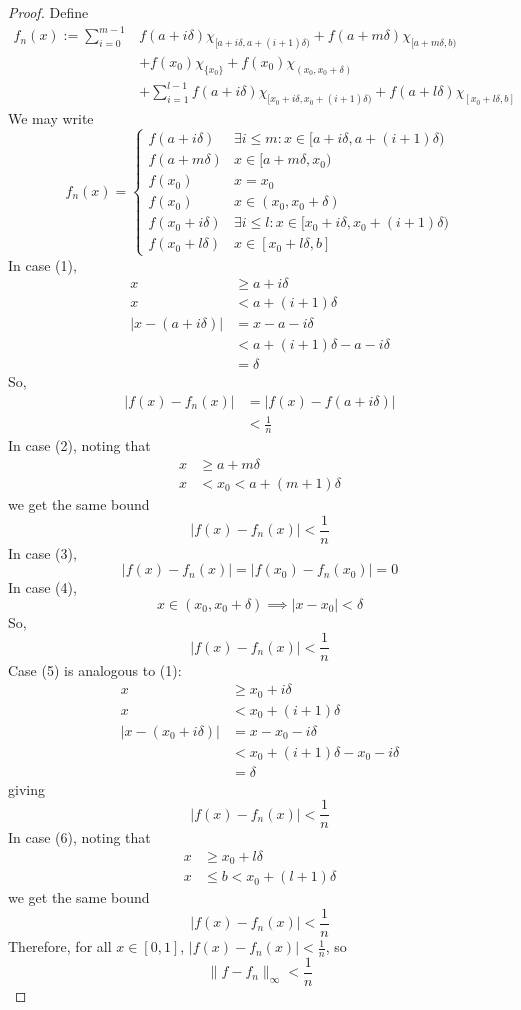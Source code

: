 \documentclass[12pt, reqno]{amsart}
\theoremstyle{definition}
\theoremstyle{remark}
\begin{document}
\begin{itemize}
\begin{itemize}
\begin{proof}
Define \begin{align*}f_{n}(x):= \sum_{i=0}^{m-1} &f(a+ i \delta)\chi_{[a+i \delta,a+(i+1) \delta)}+f\left(a+m \delta\right)\chi_{[a+m \delta,b)}\\
&+f(x_{0})\chi_{\{x_{0}\}}+f(x_{0})\chi_{(x_{0},x_{0}+\delta)}\\
&+\sum_{i=1}^{l-1}f(a+ i \delta) \chi_{[x_{0}+i \delta,x_{0}+(i+1)\delta)}+f(a+l \delta)\chi_{[x_{0}+l \delta,b]}
\end{align*}We may write 
\[
f_{n}(x)= \begin{cases}
f(a+i \delta) & \exists i\le m: x\in[a+i \delta,a+(i+1)\delta)\\
f(a+m \delta) & x\in[a+m \delta,x_{0}) \\
f(x_{0}) & x=x_{0} \\
f(x_{0}) & x\in(x_{0},x_{0}+\delta) \\
f(x_{0}+i \delta) & \exists i\le l:x\in[x_{0}+i \delta,x_{0}+(i+1)\delta) \\
f(x_{0}+l \delta) & x\in[x_{0}+l \delta,b]
\end{cases}
\]
In case (1), \begin{align*}
x&\ge a+i \delta\\
x&< a+ (i+1)\delta\\
\left|x-(a+ i \delta)\right|&= x-a-i \delta\\
&< a+(i+1)\delta-a - i \delta\\
&= \delta
\end{align*}So, \begin{align*}
\left|f(x)-f_{n}(x)\right|&= |f(x)-f(a+ i \delta)|\\
&< \frac{1}{n}
\end{align*}
In case (2), noting that \begin{align*}
x&\ge a+m \delta\\
x&<   x_{0}<a+(m+1)\delta
\end{align*}we get the same bound $$|f(x)-f_{n}(x)|< \frac{1}{n}$$
In case (3), $$|f(x)-f_{n}(x)|=|f(x_{0})-f_{n}(x_{0})|=0$$
In case (4), $$x\in(x_{0},x_{0}+\delta)\implies|x-x_{0}|<\delta$$So, $$|f(x)-f_{n}(x)|< \frac{1}{n}$$Case (5) is analogous to (1): \begin{align*}
x&\ge x_{0}+i \delta\\
x&< x_{0}+ (i+1)\delta\\
\left|x-(x_{0}+ i \delta)\right|&= x-x_{0}-i \delta\\
&< x_{0}+(i+1)\delta-x_{0} - i \delta\\
&= \delta
\end{align*}giving $$|f(x)-f_{n}(x)|< \frac{1}{n}$$In case (6), noting that \begin{align*}
x&\ge x_{0}+l \delta\\
x&\le   b<x_{0}+(l+1)\delta
\end{align*}we get the same bound $$|f(x)-f_{n}(x)|< \frac{1}{n}$$Therefore, for all $x\in [0,1]$, $|f(x)-f_{n}(x)|< \frac{1}{n}$, so $$\|f-f_{n}\|_{\infty}< \frac{1}{n}$$


\end{proof}
\end{itemize}
\end{itemize}
\end{document}
